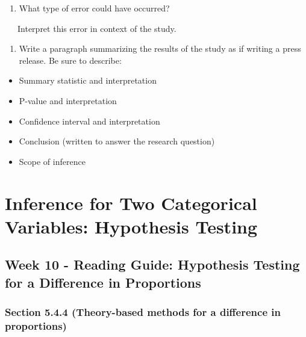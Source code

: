 \documentclass[
]{report}
\providecommand{\tightlist}{%
  \setlength{\itemsep}{0pt}\setlength{\parskip}{0pt}}
\begin{document}
\begin{enumerate}
\def\labelenumi{\arabic{enumi}.}
\setcounter{enumi}{12}
\tightlist
\item
  What type of error could have occurred?
\end{enumerate}

\vspace{0.2in}

~~~Interpret this error in context of the study.

\vspace{0.8in}

\begin{enumerate}
\def\labelenumi{\arabic{enumi}.}
\setcounter{enumi}{13}
\tightlist
\item
  Write a paragraph summarizing the results of the study as if writing a press release. Be sure to describe:
\end{enumerate}

\begin{itemize}
\item
  Summary statistic and interpretation
\item
  P-value and interpretation
\item
  Confidence interval and interpretation
\item
  Conclusion (written to answer the research question)
\item
  Scope of inference
\end{itemize}

\vspace{2in}

\hypertarget{inference-for-two-categorical-variables-hypothesis-testing-1}{%
\chapter{Inference for Two Categorical Variables: Hypothesis Testing}\label{inference-for-two-categorical-variables-hypothesis-testing-1}}

\hypertarget{week-10---reading-guide-hypothesis-testing-for-a-difference-in-proportions}{%
\section{Week 10 - Reading Guide: Hypothesis Testing for a Difference in Proportions}\label{week-10---reading-guide-hypothesis-testing-for-a-difference-in-proportions}}

\hypertarget{section-5.4.4-theory-based-methods-for-a-difference-in-proportions}{%
\subsection*{Section 5.4.4 (Theory-based methods for a difference in proportions)}\label{section-5.4.4-theory-based-methods-for-a-difference-in-proportions}}
\end{document}
